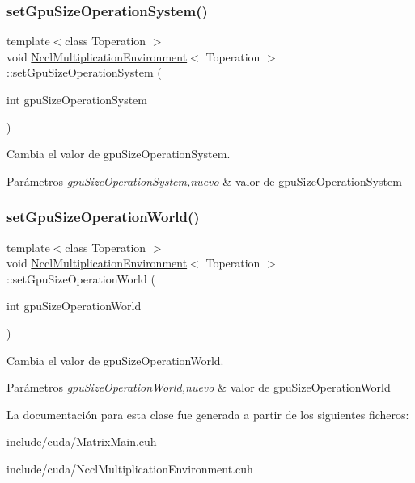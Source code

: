 \subsubsection{\texorpdfstring{set\+Gpu\+Size\+Operation\+System()}{setGpuSizeOperationSystem()}}
{\footnotesize\ttfamily template$<$class Toperation $>$ \\
void \hyperlink{classNcclMultiplicationEnvironment}{Nccl\+Multiplication\+Environment}$<$ Toperation $>$\+::set\+Gpu\+Size\+Operation\+System (\begin{DoxyParamCaption}\item[{int}]{gpu\+Size\+Operation\+System }\end{DoxyParamCaption})}



Cambia el valor de gpu\+Size\+Operation\+System. 


\begin{DoxyParams}{Parámetros}
{\em gpu\+Size\+Operation\+System,nuevo} & valor de gpu\+Size\+Operation\+System \\
\hline
\end{DoxyParams}
\mbox{\label{classNcclMultiplicationEnvironment_adf315b8c17e4c8b81e9e81c9ab95189f}} 
\subsubsection{\texorpdfstring{set\+Gpu\+Size\+Operation\+World()}{setGpuSizeOperationWorld()}}
{\footnotesize\ttfamily template$<$class Toperation $>$ \\
void \hyperlink{classNcclMultiplicationEnvironment}{Nccl\+Multiplication\+Environment}$<$ Toperation $>$\+::set\+Gpu\+Size\+Operation\+World (\begin{DoxyParamCaption}\item[{int}]{gpu\+Size\+Operation\+World }\end{DoxyParamCaption})}



Cambia el valor de gpu\+Size\+Operation\+World. 


\begin{DoxyParams}{Parámetros}
{\em gpu\+Size\+Operation\+World,nuevo} & valor de gpu\+Size\+Operation\+World \\
\hline
\end{DoxyParams}


La documentación para esta clase fue generada a partir de los siguientes ficheros\+:\begin{DoxyCompactItemize}
\item 
include/cuda/Matrix\+Main.\+cuh\item 
include/cuda/Nccl\+Multiplication\+Environment.\+cuh\end{DoxyCompactItemize}
